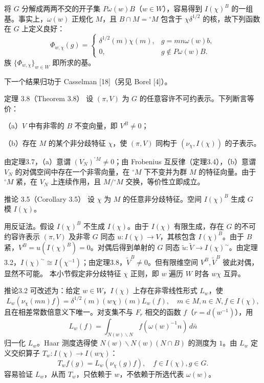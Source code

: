 将 $G$ 分解成两两不交的开子集 $P\omega(w)B$（$w\in W$），容易得到 $I(\chi)^B$ 的一组基。事实上，$\omega(w)$ 正规化 $M$，且 $B\cap M={}^\circ M$ 包含于 $\chi\delta^{1/2}$ 的核，故下列函数在 $G$ 上定义良好：
\[
\Phi_{w,\chi}(g)=\begin{cases}\delta^{1/2}(m)\chi(m),&g=mn\omega(w)b,\\0,&g\notin P\omega(w)B.\end{cases}\tag{28}
\]
族 $\{\Phi_{w,\chi}\}_{w\in W}$ 即所求的基。

下一个结果归功于 Casselman [18]（另见 Borel [4]）。
\begin{originaltheorem}{定理 3.8（Theorem 3.8）}
设 $(\pi,V)$ 为 $G$ 的任意容许不可约表示。下列断言等价：

（a）$V$ 中有非零的 $B$ 不变向量，即 $V^B\ne0$；

（b）存在 $M$ 的某个非分歧特征 $\chi$，使 $(\pi,V)$ 同构于 $(\nu_\chi,I(\chi))$ 的子表示。
\end{originaltheorem}
由定理3.7，（a）意谓 $(V_N)^{{}^\circ M}\ne0$；由 Frobenius 互反律（定理3.4），（b）意谓 $V_N$ 的对偶空间中存在一个非零向量，在 $^\circ M$ 下不变并为群 $M$ 的特征向量。由于 $^\circ M$ 紧，在 $V_N$ 上连续作用，且 $M/{}^\circ M$ 交换，等价性立即成立。
\begin{originaltheorem}{推论 3.5（Corollary 3.5）}
设 $\chi$ 为 $M$ 的任意非分歧特征。空间 $I(\chi)^B$ 生成 $G$ 模 $I(\chi)$。
\end{originaltheorem}
用反证法。假设 $I(\chi)^B$ 不生成 $I(\chi)$。由于 $I(\chi)$ 有限生成，存在 $G$ 的不可约容许表示 $(\pi,V)$ 及非零 $G$ 同态 $u:I(\chi)\to V$，其核包含 $I(\chi)^B$。由于 $B$ 紧，$V^B=u(I(\chi)^B)=0$。对偶后得到单射的 $G$ 同态 $\widetilde u:\widetilde V\to I(\chi)^\sim$。由定理3.2，$I(\chi)^\sim\cong I(\chi^{-1})$；由定理3.8，$\widetilde V^B\ne0$。但有限维空间 $V^B,\widetilde V^B$ 彼此对偶，显然不可能。
本小节假定非分歧特征 $\chi$ 正则，即 $w$ 遍历 $W$ 时各 $w\chi$ 互异。

推论3.2 可改述为：给定 $w\in W$，$I(\chi)$ 上存在非零线性形式 $L_w$，使
\[
L_w(\nu_\chi(mn)f)=\delta^{1/2}(m)(w\chi)(m)L_w(f),\quad m\in M,n\in N,f\in I(\chi),\tag{29}
\]
且在相差常数倍意义下唯一。对支集不与 $F_r$ 相交的函数 $f$（$r=d(w^{-1})$），用
\[
L_w(f)=\int_{N(w)\backslash N}f(\omega(w)^{-1}n)\,d\bar n\tag{30}
\]
归一化 $L_w$。Haar 测度选得使 $N(w)\backslash N(w)(N\cap B)$ 的测度为 $1$。由 $L_w$ 定义交织算子 $T_w:I(\chi)\to I(w\chi)$：
\[
T_wf(g)=L_w(\nu_\chi(g)f),\quad f\in I(\chi),g\in G.\tag{31}
\]
容易验证 $L_w$，从而 $T_w$，只依赖于 $w$，不依赖于所选代表 $\omega(w)$。

